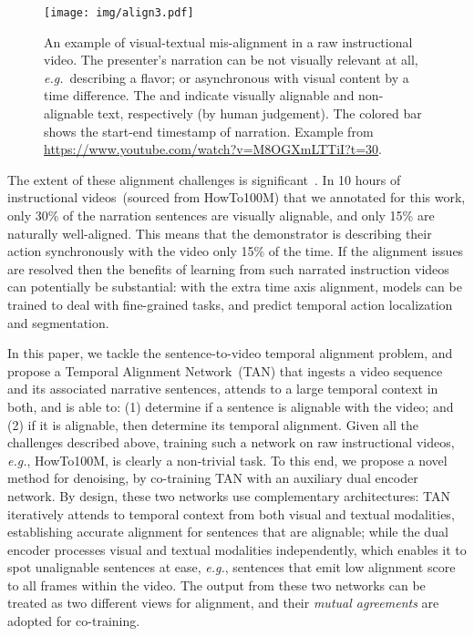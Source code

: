 \begin{figure*}[t]
    \centering
	\texttt{[image: img/align3.pdf]}
	\vspace*{-7mm}
	\caption{
	\footnotesize{An example of visual-textual mis-alignment in a raw instructional video.
	The presenter's narration can be not visually relevant at all, 
	{\em e.g.}~describing a flavor;
	or asynchronous with visual content by a time difference.
	The \textcolor{googleblue}{\textbf{\cmark}} and \textcolor{googleorange}{\textbf{\xmark}} 
	indicate visually alignable and non-alignable text, respectively (by human judgement). 
	The colored bar shows the start-end timestamp of narration. 
	Example from \scriptsize{\url{https://www.youtube.com/watch?v=M8OGXmLTTiI?t=30}}.}}
\vspace{-14pt}
\label{fig:align}
\end{figure*}

The extent of these alignment challenges is significant~\cite{Miech19,Miech20}.
In 10 hours of instructional videos~(sourced from HowTo100M) 
that we annotated for this work, 
only 30\% of the narration sentences are visually alignable, 
and only {15\%} are naturally well-aligned.
This means that 
the demonstrator is describing their action 
synchronously with the video only 15\% of the time.
If the alignment issues are resolved then the benefits of learning 
from such narrated instruction videos can potentially be substantial: 
with the extra time axis alignment, models can be trained to deal with fine-grained tasks, 
and predict temporal action localization and segmentation.

In this paper, we  tackle the sentence-to-video temporal alignment problem,
and propose a Temporal Alignment Network~(TAN) that ingests a video sequence and its associated narrative sentences, 
attends to a large temporal context in both, and is able to: 
(1) determine if a sentence is alignable with the video; 
and (2) if it is alignable, then determine its temporal alignment.
Given all the challenges described above, training such a network on raw instructional videos, 
{\em e.g.}, HowTo100M, is clearly a non-trivial task.
To this end, we propose a novel method for denoising, 
by co-training TAN with an auxiliary dual encoder network.
By design, these two networks use complementary architectures:
TAN iteratively attends to temporal context from both visual and textual modalities,
establishing accurate alignment for sentences that are alignable;
while the dual encoder processes visual and textual modalities independently, 
which enables it to spot unalignable sentences at ease, 
{\em e.g.}, sentences that emit low alignment score to all frames within the video.
The output from these two networks can be treated as two different views for alignment,
and their {\em mutual agreements} are adopted for co-training.

